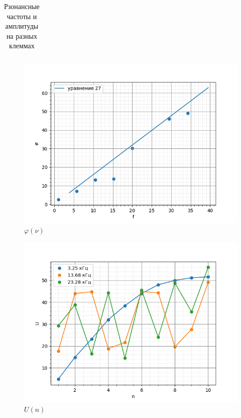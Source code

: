 \documentclass[a4paper,12 pt]{article}
\begin{document}
\begin{table}[H]
\begin{tabular}{|p{2 cm}|p{2 cm}|p{2 cm}|p{2 cm}|p{2 cm}|p{2 cm}|}
    
    \end{tabular}
    \caption{Рзонансные частоты и амплитуды на разных клеммах}
    \label{tab:my_label}
\end{table}

\begin{figure}[H]
    \centering
    \includegraphics[scale=0.7]{phi(f).png}
    \caption{$\varphi(\nu)$}
\end{figure}



\begin{figure}[H]
    \centering
    \includegraphics[scale=0.7]{weird1.png}
    \caption{$U(n)$}
\end{figure}
\end{document}
